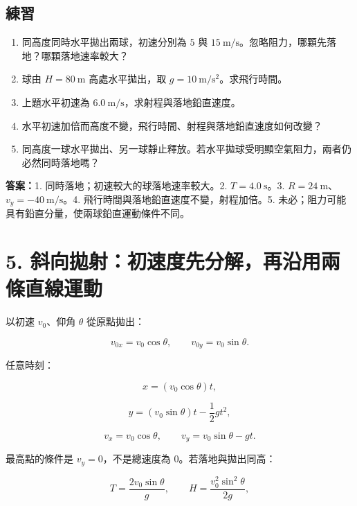 \documentclass[11pt,a4paper]{article}
\providecommand{\tightlist}{%
  \setlength{\itemsep}{0pt}\setlength{\parskip}{0pt}}
\begin{document}
\begin{HandoutSelfCheck}

\subsection{練習}\label{ux7df4ux7fd2-3}

\begin{enumerate}
\def\labelenumi{\arabic{enumi}.}
\tightlist
\item
  同高度同時水平拋出兩球，初速分別為 \(5\) 與 \(15\ \mathrm{m/s}\)。忽略阻力，哪顆先落地？哪顆落地速率較大？
\item
  球由 \(H=80\ \mathrm m\) 高處水平拋出，取 \(g=10\ \mathrm{m/s^2}\)。求飛行時間。
\item
  上題水平初速為 \(6.0\ \mathrm{m/s}\)，求射程與落地鉛直速度。
\item
  水平初速加倍而高度不變，飛行時間、射程與落地鉛直速度如何改變？
\item
  同高度一球水平拋出、另一球靜止釋放。若水平拋球受明顯空氣阻力，兩者仍必然同時落地嗎？
\end{enumerate}

\textbf{答案：}1. 同時落地；初速較大的球落地速率較大。2. \(T=4.0\ \mathrm s\)。3. \(R=24\ \mathrm m\)、\(v_y=-40\ \mathrm{m/s}\)。4. 飛行時間與落地鉛直速度不變，射程加倍。5. 未必；阻力可能具有鉛直分量，使兩球鉛直運動條件不同。

\end{HandoutSelfCheck}

\section{5. 斜向拋射：初速度先分解，再沿用兩條直線運動}\label{ux659cux5411ux62cbux5c04ux521dux901fux5ea6ux5148ux5206ux89e3ux518dux6cbfux7528ux5169ux689dux76f4ux7ddaux904bux52d5}

以初速 \(v_0\)、仰角 \(\theta\) 從原點拋出：

\[
v_{0x}=v_0\cos\theta,
\qquad
v_{0y}=v_0\sin\theta.
\]

任意時刻：

\[
\boxed{x=(v_0\cos\theta)t},
\]

\[
\boxed{y=(v_0\sin\theta)t-\frac12gt^2},
\]

\[
v_x=v_0\cos\theta,
\qquad
v_y=v_0\sin\theta-gt.
\]

最高點的條件是 \(v_y=0\)，不是總速度為 0。若落地與拋出同高：

\[
T=\frac{2v_0\sin\theta}{g},
\qquad
H=\frac{v_0^2\sin^2\theta}{2g},
\]
\end{document}
